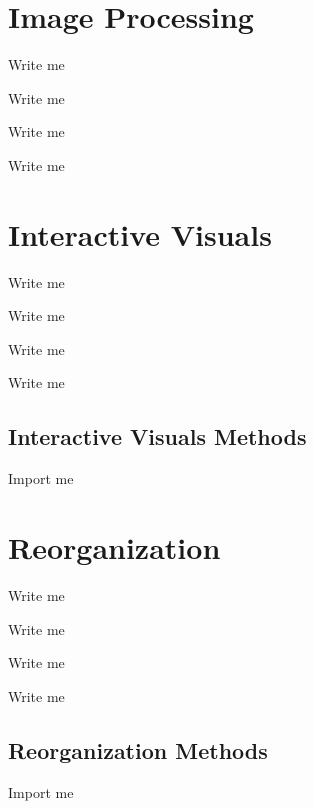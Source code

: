 \documentclass[letterpaper,10pt,english]{sphinxmanual}
\begin{document}
\section{Image Processing}
\label{\detokenize{Sub-Packages:image-processing}}\label{\detokenize{Sub-Packages:image-processing-module}}
\begin{DUlineblock}{0em}
\item[] Write me
\item[] Write me
\item[] Write me
\item[] Write me
\end{DUlineblock}


\section{Interactive Visuals}
\label{\detokenize{Sub-Packages:interactive-visuals}}\label{\detokenize{Sub-Packages:interactive-visuals-module}}
\begin{DUlineblock}{0em}
\item[] Write me
\item[] Write me
\item[] Write me
\item[] Write me
\end{DUlineblock}


\subsection{Interactive Visuals Methods}
\label{\detokenize{Sub-Packages:interactive-visuals-methods}}
\begin{DUlineblock}{0em}
\item[] Import me
\end{DUlineblock}


\section{Reorganization}
\label{\detokenize{Sub-Packages:reorganization}}\label{\detokenize{Sub-Packages:reorganization-module}}
\begin{DUlineblock}{0em}
\item[] Write me
\item[] Write me
\item[] Write me
\item[] Write me
\end{DUlineblock}


\subsection{Reorganization Methods}
\label{\detokenize{Sub-Packages:reorganization-methods}}
\begin{DUlineblock}{0em}
\item[] Import me
\end{DUlineblock}
\end{document}
